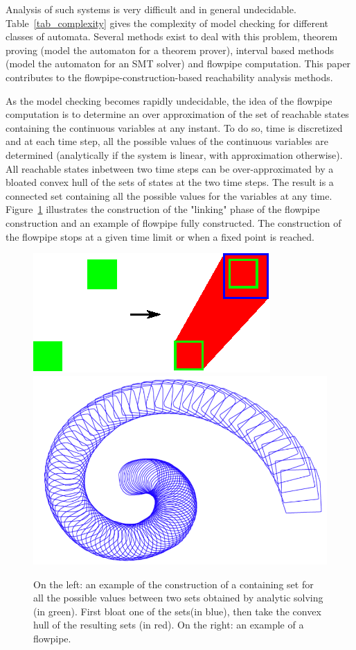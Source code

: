 Analysis of such systems is very difficult and in general undecidable. Table~\ref{tab_complexity} gives the complexity of model checking for different classes of automata. Several methods exist to deal with this problem, theorem proving (model the automaton for a theorem prover), interval based methods (model the automaton for an SMT solver) and flowpipe computation. This paper contributes to the flowpipe-construction-based reachability analysis methods. 

As the model checking becomes rapidly undecidable, the idea of the flowpipe computation is to determine an over approximation of the set of reachable states containing the continuous variables at any instant. To do so, time is discretized and at each time step, all the possible values of the continuous variables are determined (analytically if the system is linear, with approximation otherwise). All reachable states inbetween two time steps can be over-approximated by a bloated convex hull of the sets of states at the two time steps. The result is a connected set containing all the possible values for the variables at any time. Figure~\ref{fowpipeconstruction} illustrates the construction of the "linking" phase of the flowpipe construction and an example of flowpipe fully constructed. The construction of the flowpipe stops at a given time limit or when a fixed point is reached.

\begin{figure}
\includegraphics[width=0.45\columnwidth]{images/flowpipe.eps}
\includegraphics[width=0.45\columnwidth]{images/zono.png}
\caption{On the left: an example of the construction of a containing set for all the possible values between two sets obtained by analytic solving (in green). First bloat one of the sets(in blue), then take the convex hull of the resulting sets (in red). On the right: an example of a flowpipe.}
\label{fowpipeconstruction}
\end{figure}

